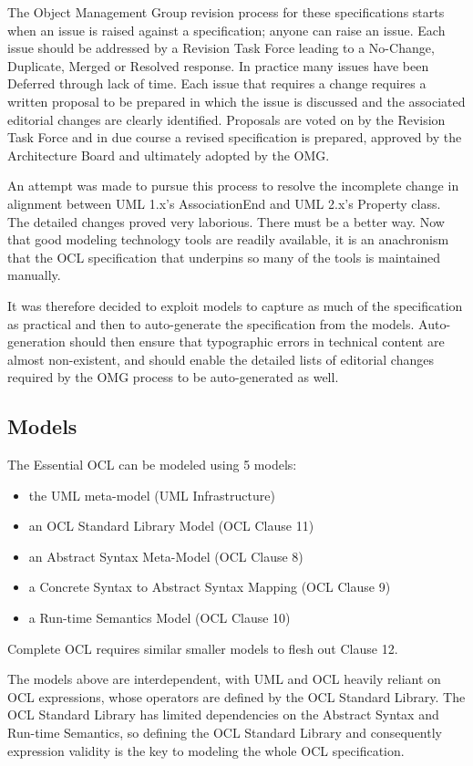 \documentclass{eceasst}
\begin{document}
The Object Management Group revision process for these specifications starts when an issue is raised against a specification; anyone can raise an issue. Each issue should be addressed by a Revision Task Force leading to a No-Change, Duplicate, Merged or Resolved response. In practice many issues have been Deferred through lack of time. Each issue that requires a change requires a written proposal to be prepared in which the issue is discussed and the associated editorial changes are clearly identified. Proposals are voted on by the Revision Task Force and in due course a revised specification is prepared, approved by the Architecture Board and ultimately adopted by the OMG.

An attempt was made to pursue this process to resolve the incomplete change in alignment between UML 1.x's AssociationEnd and UML 2.x's Property class. The detailed changes proved very laborious. There must be a better way. Now that good modeling technology tools are readily available, it is an anachronism that the OCL specification that underpins so many of the tools is maintained manually.

It was therefore decided to exploit models to capture as much of the specification as practical and then to auto-generate the specification from the models. Auto-generation should then ensure that typographic errors in technical content are almost non-existent, and should enable the detailed lists of editorial changes required by the OMG process to be auto-generated as well.

\subsection{Models}

The Essential OCL can be modeled using 5 models:
\begin{itemize}
\item the UML meta-model (UML Infrastructure)
\item an OCL Standard Library Model (OCL Clause 11)
\item an Abstract Syntax Meta-Model (OCL Clause 8)
\item a Concrete Syntax to Abstract Syntax Mapping (OCL Clause 9)
\item a Run-time Semantics Model (OCL Clause 10)
\end{itemize}

Complete OCL requires similar smaller models to flesh out Clause 12.

The models above are interdependent, with UML and OCL heavily reliant on OCL expressions, whose operators are defined by the OCL Standard Library. The OCL Standard Library has limited dependencies on the Abstract Syntax and Run-time Semantics, so defining the OCL Standard Library and consequently expression validity is the key to modeling the whole OCL specification.
\end{document}
